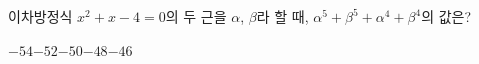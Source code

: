 이차방정식 $x^2+x-4=0$의 두 근을 $\alpha$, $\beta$라 할 때, $\alpha^5+\beta^5+\alpha^4+\beta^4$의 값은?
\begin{choices32}{$-54$}{$-52$}{$-50$}{$-48$}{$-46$}\end{choices32}
